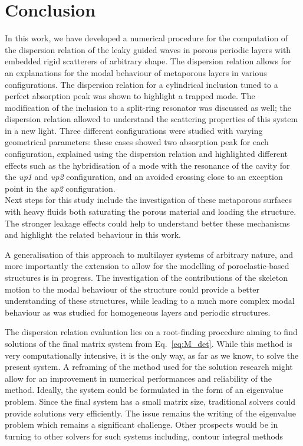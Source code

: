 \section{Conclusion}\label{sec:conclusion}
In this work, we have developed a numerical procedure for the computation of the dispersion relation of the leaky guided waves in porous periodic layers with embedded rigid scatterers of arbitrary shape. The dispersion relation allows for an explanations for the modal behaviour of metaporous layers in various configurations. The dispersion relation for a cylindrical inclusion tuned to a perfect absorption peak was shown to highlight a trapped mode. The modification of the inclusion to a split-ring resonator was discussed as well; the dispersion relation allowed to understand the scattering properties of this system in a new light. Three different configurations were studied with varying geometrical parameters: these cases showed two absorption peak for each configuration, explained using the dispersion relation and highlighted different effects such as the hybridisation of a mode with the resonance of the cavity for the \textit{up1} and \textit{up2} configuration, and an avoided crossing close to an exception point in the \textit{up2} configuration. \\

Next steps for this study include the investigation of these metaporous surfaces with heavy fluids both saturating the porous material and loading the structure. The stronger leakage effects could help to understand better these mechanisms and highlight the related behaviour in this work. 

A generalisation of this approach to multilayer systems of arbitrary nature, and more importantly the extension to allow for the modelling of poroelastic-based structures is in progress. The investigation of the contributions of the skeleton motion to the modal behaviour of the structure could provide a better understanding of these structures, while leading to a much more complex modal behaviour as was studied for homogeneous layers \cite{boeckx2005, marechal2025} and periodic structures\cite{wang2020}. 

The dispersion relation evaluation lies on a root-finding procedure aiming to find solutions of the final matrix system from Eq.~\ref{eq:M_det}. While this method is very computationally intensive, it is the only way, as far as we know, to solve the present system. A reframing of the method used for the solution research might allow for an improvement in numerical performances and reliability of the method. Ideally, the system could be formulated in the form of an eigenvalue problem. Since the final system has a small matrix size, traditional solvers could provide solutions very efficiently. The issue remains the writing of the eigenvalue problem which remains a significant challenge. Other prospects would be in turning to other solvers for such systems including, contour integral methods


